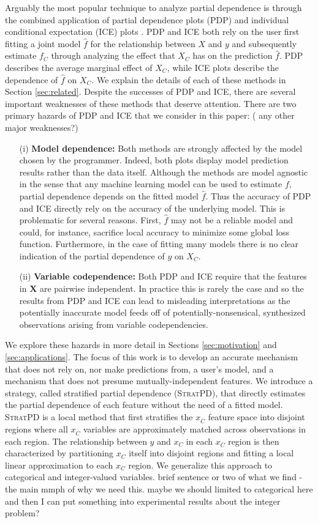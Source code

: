 \documentclass[12pt]{article}
\newcommand{\spd}{\fontfamily{cmr}\textsc{\small StratPD}}
\newcommand{\xnC}{$x_{\overline{C}}$}
\begin{document}
Arguably the most popular technique to analyze partial dependence is through the combined application of partial dependence plots (PDP) \citep{PDP} and individual conditional expectation (ICE) plots \citep{ICE}. PDP and ICE both rely on the user first fitting a joint model $\widehat{f}$ for the relationship between $X$ and $y$ and subsequently estimate $f_C$ through analyzing the effect that $X_C$ has on the prediction $\widehat{f}$. PDP describes the average marginal effect of $X_C$, while ICE plots describe the dependence of $\widehat{f}$ on $X_C$. We explain the details of each of these methods in Section \ref{sec:related}. Despite the successes of PDP and ICE, there are several important weaknesses of these methods that deserve attention. There are two primary hazards of PDP and ICE that we consider in this paper: ({\color{red} any other major weaknesses?})
\begin{itemize}
	\item[(i)] {\bf Model dependence:} Both methods are strongly affected by the model chosen by the programmer. Indeed, both plots display model prediction results rather than the data itself. Although the methods are model agnostic in the sense that any machine learning model can be used to estimate $f$, partial dependence depends on the fitted model $\widehat{f}$. Thus the accuracy of PDP and ICE directly rely on the accuracy of the underlying model. This is problematic for several reasons. First, $\widehat{f}$ may not be a reliable model and could, for instance, sacrifice local accuracy to minimize some global loss function. Furthermore, in the case of fitting many models there is no clear indication of the partial dependence of $y$ on $X_C$.
	\item[(ii)] {\bf Variable codependence:} Both PDP and ICE require that the features in $\mathbf{X}$ are pairwise independent. In practice this is rarely the case and so the results from PDP and ICE can lead to misleading interpretations as the potentially inaccurate model feeds off of potentially-nonsensical, synthesized observations arising from variable codependencies.  
\end{itemize}
We explore these hazards in more detail in Sections \ref{sec:motivation} and \ref{sec:applications}. The focus of this work is to develop an accurate mechanism that does not rely on, nor make predictions from, a user's model, and a mechanism that does not presume mutually-independent features. We introduce a strategy, called stratified partial dependence (\spd{}), that directly estimates the partial dependence of each feature without the need of a fitted model.  \spd{} is a local method that first stratifies the \xnC{} feature space into disjoint regions where all \xnC{} variables are approximately matched across observations in each region. The relationship between $y$ and $x_C$ in each \xnC{} region is then characterized by partitioning $x_C$ itself into disjoint regions and fitting a local linear approximation to each $x_C$ region. We generalize this approach to categorical and integer-valued variables. {\color{red} brief sentence or two of what we find - the main mmph of why we need this. maybe we should limited to categorical here and then I can put something into experimental results about the integer problem?}
\end{document}
